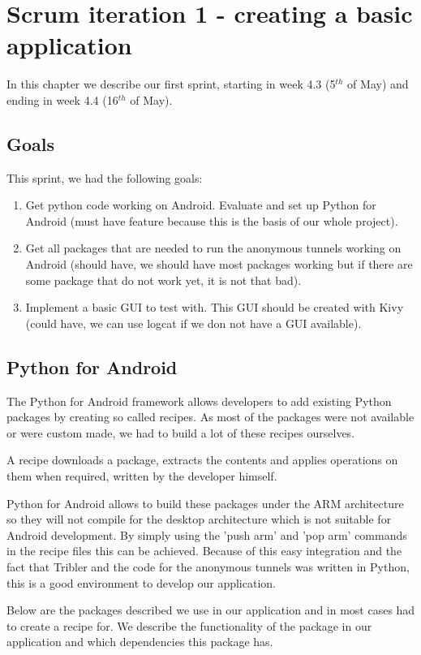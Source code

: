 \chapter{Scrum iteration 1 - creating a basic application}
\label{iteration1}
	In this chapter we describe our first sprint, starting in week 4.3 (5$^{th}$ of May) and ending in week 4.4 (16$^{th}$ of May).

	\section{Goals}
		This sprint, we had the following goals:
	
		\begin{enumerate}
			\item Get python code working on Android. Evaluate and set up Python for Android (must have feature because this is the basis of our whole project).
			\item Get all packages that are needed to run the anonymous tunnels working on Android (should have, we should have most packages working but if there are some package that do not work yet, it is not that bad).
			\item Implement a basic GUI to test with. This GUI should be created with Kivy (could have, we can use logcat if we don not have a GUI available).
		\end{enumerate}
	
	\section{Python for Android}
		The Python for Android framework allows developers to add existing Python packages by creating so called recipes. As most of the packages were not available or were custom made, we had to build a lot of these recipes ourselves.
	
		A recipe downloads a package, extracts the contents and applies operations on them when required, written by the developer himself.
	
		Python for Android allows to build these packages under the ARM architecture so they will not compile for the desktop architecture which is not suitable for Android development. By simply using the 'push arm' and 'pop arm' commands in the recipe files this can be achieved. Because of this easy integration and the fact that Tribler and the code for the anonymous tunnels was written in Python, this is a good environment to develop our application.
	
		Below are the packages described we use in our application and in most cases had to create a recipe for. We describe the functionality of the package in our application and which dependencies this package has.
	

